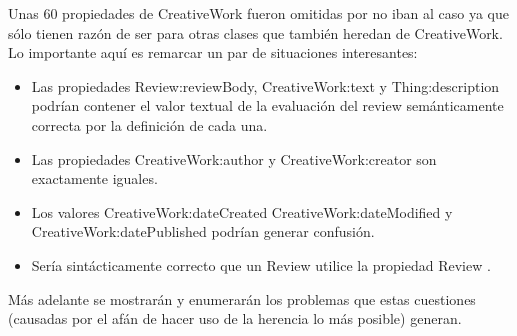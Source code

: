 \noindent Unas 60 propiedades de CreativeWork fueron omitidas por no iban al caso ya que sólo tienen razón de ser para otras clases que 
también heredan de CreativeWork. Lo importante aquí es remarcar un par de situaciones interesantes:

\begin{itemize}
 \item Las propiedades Review:reviewBody, CreativeWork:text y Thing:description podrían contener el valor textual de la evaluación del review semánticamente correcta por la definición de cada una.

 \item Las propiedades CreativeWork:author y CreativeWork:creator son exactamente iguales. 

 \item Los valores CreativeWork:dateCreated CreativeWork:dateModified y CreativeWork:datePublished podrían generar confusión. 

 \item Sería sintácticamente correcto que un Review utilice la propiedad Review .
\end{itemize}

Más adelante se mostrarán y enumerarán los problemas que estas cuestiones (causadas por el afán de hacer uso de la herencia
lo más posible)  generan. 
